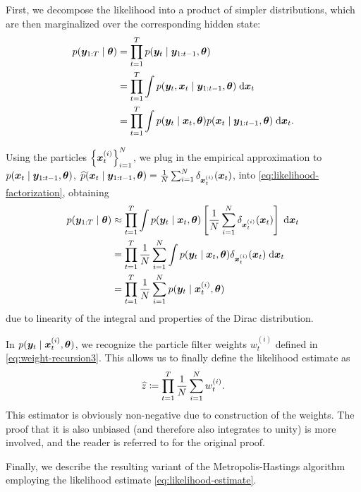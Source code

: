 First, we decompose the likelihood into a product of simpler distributions, which are then marginalized over the corresponding hidden state:
\begin{equation} \label{eq:likelihood-factorization}
\begin{split}
p(\bm{y}_{1:T} \mid \bm{\theta}) &= \prod_{t=1}^T p(\bm{y}_t \mid \bm{y}_{1:t-1}, \bm{\theta}) \\
&= \prod_{t=1}^T \int p(\bm{y}_t, \bm{x}_t \mid \bm{y}_{1:t-1}, \bm{\theta}) \; \mathrm{d}{\bm{x}_t} \\
&= \prod_{t=1}^T \int p(\bm{y}_t \mid \bm{x}_t, \bm{\theta}) p(\bm{x}_t \mid \bm{y}_{1:t-1}, \bm{\theta}) \; \mathrm{d}{\bm{x}_t}.
\end{split}
\end{equation}

Using the particles $\left\{\bm{x}_t^{(i)}\right\}_{i=1}^N$, we plug in the empirical approximation to $p(\bm{x}_t \mid \bm{y}_{1:t-1}, \bm{\theta})$, $\widehat{p}(\bm{x}_t \mid \bm{y}_{1:t-1}, \bm{\theta}) = \frac{1}{N} \sum_{i=1}^N \delta_{\bm{x}_t^{(i)}}(\bm{x}_t)$, into \eqref{eq:likelihood-factorization}, obtaining
\begin{equation*}
\begin{split}
p(\bm{y}_{1:T} \mid \bm{\theta}) & \approx \prod_{t=1}^T \int p(\bm{y}_t \mid \bm{x}_t, \bm{\theta}) \left[ \frac{1}{N} \sum_{i=1}^N \delta_{\bm{x}_t^{(i)}}(\bm{x}_t) \right] \; \mathrm{d}{\bm{x}_t} \\
& = \prod_{t=1}^T \frac{1}{N} \sum_{i=1}^N \int p(\bm{y}_t \mid \bm{x}_t, \bm{\theta}) \delta_{\bm{x}_t^{(i)}}(\bm{x}_t) \; \mathrm{d}{\bm{x}_t} \\
& = \prod_{t=1}^T \frac{1}{N} \sum_{i=1}^N p(\bm{y}_t \mid \bm{x}_t^{(i)}, \bm{\theta})
\end{split}
\end{equation*}
due to linearity of the integral and properties of the Dirac distribution.

In $p(\bm{y}_t \mid \bm{x}_t^{(i)}, \bm{\theta})$, we recognize the particle filter weights $w_t^{(i)}$ defined in \eqref{eq:weight-recursion3}. This allows us to finally define the likelihood estimate as
\begin{equation} \label{eq:likelihood-estimate}
\widehat{z} \coloneqq \prod_{t=1}^T \frac{1}{N} \sum_{i=1}^N w_t^{(i)}.
\end{equation}
This estimator is obviously non-negative due to construction of the weights. The proof that it is also unbiased (and therefore also integrates to unity) is more involved, and the reader is referred to \cite{del-moral} for the original proof.

Finally, we describe the resulting variant of the Metropolis-Hastings algorithm employing the likelihood estimate \eqref{eq:likelihood-estimate}.

